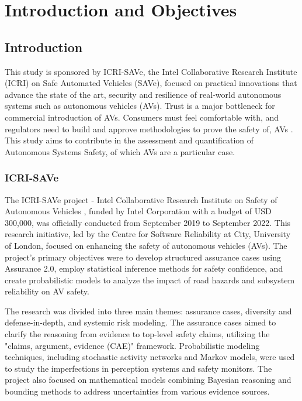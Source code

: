 \chapter{Introduction and Objectives}
\label{Intro} 


\section{Introduction}

This study is sponsored by ICRI-SAVe, the Intel Collaborative Research Institute (ICRI) on Safe Automated Vehicles (SAVe), focused on practical innovations that advance the state of the art, security and resilience of real-world autonomous systems such as autonomous vehicles (AVs). Trust is a major bottleneck for commercial introduction of AVs. Consumers must feel comfortable with, and regulators need to build and approve methodologies to prove the safety of, AVs \cite{ICRI-SAVe2024}. This study aims to contribute in the assessment and quantification of Autonomous Systems Safety, of which AVs are a particular case.

\subsection{ICRI-SAVe}

The ICRI-SAVe project - Intel Collaborative Research Institute on Safety of Autonomous Vehicles \cite{ICRI-SAVe2024}, funded by Intel Corporation with a budget of USD 300,000, was officially conducted from September 2019 to September 2022. This research initiative, led by the Centre for Software Reliability at City, University of London, focused on enhancing the safety of autonomous vehicles (AVs). The project's primary objectives were to develop structured assurance cases using Assurance 2.0, employ statistical inference methods for safety confidence, and create probabilistic models to analyze the impact of road hazards and subsystem reliability on AV safety.

The research was divided into three main themes: assurance cases, diversity and defense-in-depth, and systemic risk modeling. The assurance cases aimed to clarify the reasoning from evidence to top-level safety claims, utilizing the "claims, argument, evidence (CAE)" framework. Probabilistic modeling techniques, including stochastic activity networks and Markov models, were used to study the imperfections in perception systems and safety monitors. The project also focused on mathematical models combining Bayesian reasoning and bounding methods to address uncertainties from various evidence sources.

